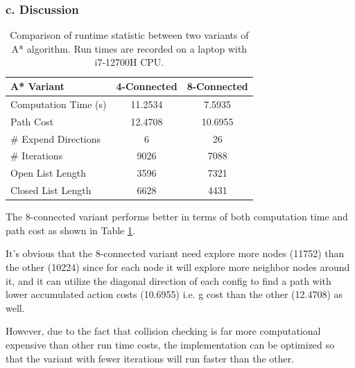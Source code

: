 \documentclass{article}
\theoremstyle{definition} %
\begin{document}
\subsubsection*{c. Discussion}

\begin{table}[H]
	\centering
	\begin{tabular}{@{}lcc@{}}
		\toprule
		A* Variant           & 4-Connected & 8-Connected \\ 
		\midrule
		Computation Time (s) & 11.2534     & 7.5935  \\
		Path Cost            & 12.4708     & 10.6955 \\
		\# Expend Directions & 6           & 26      \\
		\# Iterations        & 9026        & 7088    \\
		Open List Length     & 3596    	   & 7321    \\ 
		Closed List Length    & 6628    	   & 4431    \\ 
		\bottomrule
	\end{tabular}
	\caption{Comparison of runtime statistic between two variants of A* algorithm. Run times are recorded on a laptop with i7-12700H CPU.}
	\label{tab:astar_cmp}
\end{table}

The 8-connected variant performs better in terms of both computation time and path cost as shown in Table \ref{tab:astar_cmp}.

It's obvious that the 8-connected variant need explore more nodes (11752) than the other (10224) since for each node it will explore more neighbor nodes around it, and it can utilize the diagonal direction of each config to find a path with lower accumulated action costs (10.6955) i.e. g cost than the other (12.4708) as well.

However, due to the fact that collision checking is far more computational expensive than other run time costs, the implementation can be optimized so that the variant with fewer iterations will run faster than the other.
\end{document}
